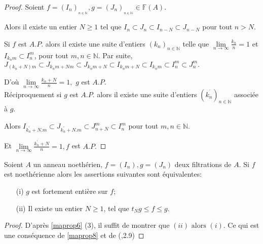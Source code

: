 \begin{proof}
	Soient $f=(I_{n})_{_{n\in \mathbb{N}}},g=(J_{n})_{_{n\in\mathbb{N}}}\in \mathbb{F}(A).$
	
	Alors il existe un entier $N\geq 1$ tel que $I_{n}\subset J_{n}\subset
	I_{n-N}\subset J_{n-N}$ pour tout $n> N.$
	
	Si $f$ est $A.P.$ alors il existe une suite d'entiers $(k_{n})_{n\in \mathbb{N}}$ telle que $\underset{n\longrightarrow \infty }{\lim }\frac{k_{n}}{n}=1$ et $I_{k_{n}m}\subset I_{n}^{m}$,
	pour tout $m,n\in \mathbb{N}.$
	Par suite, $J_{(k_{n}+N)m}\subset J_{k_{n}m+Nm}\subset J_{k_{n}m+N}\subset I_{k_{n}m+N}\subset I_{k_{n}m}\subset I_{n}^{m}\subset J_{n}^{m}.$
	
	D'où $\underset{n\longrightarrow \infty }{\lim }\frac{k_{n}+N}{n}=1,$ $g$ est $A.P.$\\
	Réciproquement si $g$ est $A.P.$ alors il existe une suite d'entiers $(k_{n}^{^{\prime }})_{n\in \mathbb{N}}$ associée à $g.$
	
	Alors $I_{k_{n}^{\prime }+N.m}\subset J_{k_{n}^{\prime }+N.m}\subset J_{n+N}^{m}\subset I_{n}^{m}$ pour tout $m,n\in \mathbb{N}.$
	
	Et $\underset{n\longrightarrow \infty }{\lim }\frac{k_{n}^{\prime }+N}{n}=1,f$ est $A.P.$
\end{proof}
\begin{maproposition}
	\label{maprop10}
	Soient $A$ un anneau noethérien, $f=(I_n) , g=(J_n)$ deux filtrations de $A$. Si $f$ est noethérienne alors les assertions suivantes sont équivalentes:
	\begin{enumerate}
		\item[(i)] $g$ est fortement entière sur $f$;
		\item[(ii)] Il existe un entier $N \geqslant 1$, tel que $t_Ng \leqslant f \leqslant g$.
	\end{enumerate}
\end{maproposition}
\begin{proof}
	D'après \ref{maprop6} (3), il suffit de montrer que $(ii) \text{ alors } (i)$. Ce qui est une conséquence de \ref{maprop8} et de (\cite{Ok},2.9)
\end{proof}
